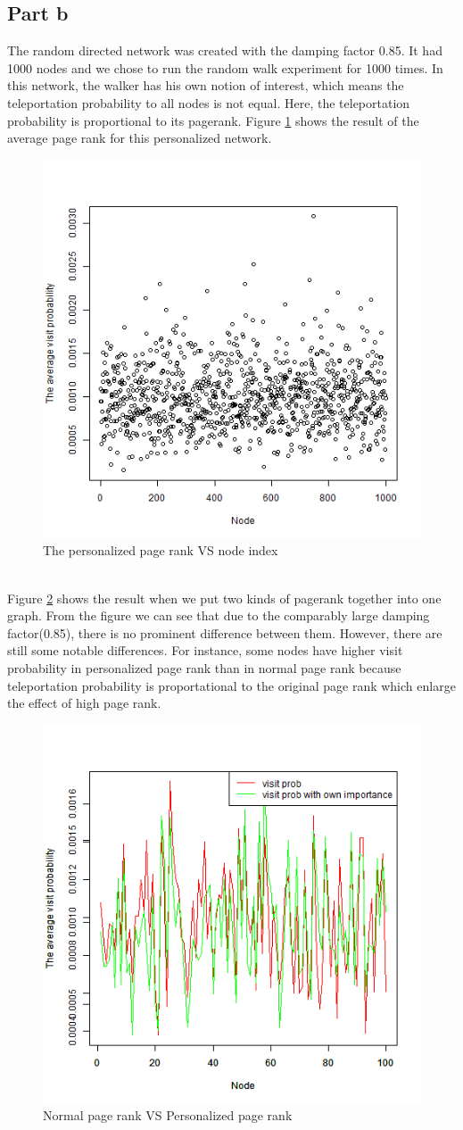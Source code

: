 \documentclass{article}
\begin{document}
\subsection{Part b}
The random directed network was created with the damping factor 0.85. It had 1000 nodes and we chose to run the random walk experiment for 1000 times. In this network, the walker has his own notion of interest, which means the teleportation probability to all nodes is not equal. Here, the teleportation probability is proportional to its pagerank. Figure \ref{fig:p4_b} shows the result of the average page rank for this personalized network.\\
\begin{figure}[htbp]
\centering
\includegraphics[width=.6\textwidth]{p4_b.png}
\caption{The personalized page rank VS node index}
\label{fig:p4_b}
\end{figure}
\\
Figure \ref{fig:p4_comp} shows the result when we put two kinds of pagerank together into one graph. From the figure we can see that due to the comparably large damping factor(0.85), there is no prominent difference between them. However, there are still some notable differences. For instance, some nodes have higher visit probability in personalized page rank than in normal page rank because teleportation probability is proportational to the original page rank which enlarge the effect of high page rank.
\begin{figure}[htbp]
\centering
\includegraphics[width=.6\textwidth]{p4_compare.png}
\caption{Normal page rank VS Personalized page rank}
\label{fig:p4_comp}
\end{figure}
\end{document}
